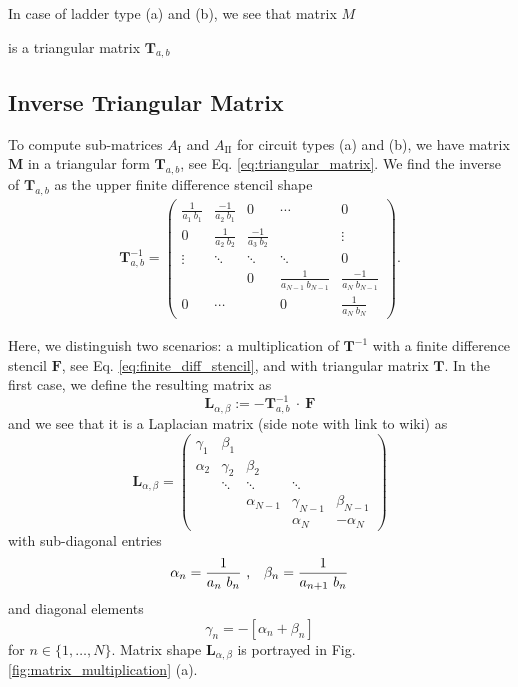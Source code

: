 \documentclass[a4paper, 10pt, twoside, twocolumn]{scrartcl}
\begin{document}
In case of ladder type (a) and (b), we see that matrix $M$

is a triangular matrix $\mathbf{T}_{a,b}$

\subsection*{Inverse Triangular Matrix}
To compute sub-matrices $A_{\mathrm{I}}$ and $A_{\mathrm{II}}$ for circuit types (a) and (b), we have matrix $\mathbf{M}$ in a triangular form $\mathbf{T}_{a,b}$, see Eq. \eqref{eq:triangular_matrix}. We find the inverse of $\mathbf{T}_{a,b}$ as the upper finite difference stencil shape 
\begin{align*}
	\mathbf{T}_{a,b}^{-1} = 
	\begin{pmatrix}
		\frac{1}{a_{1} ~ b_{1}} & \frac{-1}{a_{2} ~ b_{1}} & 0  						& \cdots & 0 \\[1ex]
		0 						 &   \frac{1}{a_{2} ~ b_{2}} & \frac{-1}{a_{3} ~ b_{2}} &  & \vdots \\
		\vdots 				 		 &  \ddots 					 & \ddots 					 & \ddots & 0	 \\
		&  & 0 & \frac{1}{a_{N-1} ~ b_{N-1}} & \frac{-1}{a_{N} ~ b_{N-1}} \\[1ex]
		0  & \cdots 	& &  			0			   & \frac{1}{a_{N} ~ b_{N}} 
	\end{pmatrix} \text{.}
\end{align*}

Here, we distinguish two scenarios: a multiplication of $\mathbf{T}^{-1}$ with a finite difference stencil $\mathbf{F}$, see Eq. \eqref{eq:finite_diff_stencil}, and with triangular matrix $\mathbf{T}$. In the first case, we define the resulting matrix as
\begin{equation}
	\mathbf{L}_{\alpha,\beta} := -\mathbf{T}_{a,b}^{-1} ~\cdot~ \mathbf{F}
\end{equation}
and we see that it is a Laplacian matrix {\color{red} (side note with link to wiki)} as
\begin{equation}
	\mathbf{L}_{\alpha,\beta} =
	\begin{pmatrix}
		\gamma_{1} & \beta_{1} \\
		\alpha_{2} & \gamma_{2} & \beta_{2} \\
		& \ddots & \ddots & \ddots \\
		& & \alpha_{N-1} & \gamma_{N-1} & \beta_{N-1} \\
		& & & \alpha_{N} & -\alpha_{N}
	\end{pmatrix}
\end{equation}
with sub-diagonal entries
\begin{equation}
	\alpha_{n} = \frac{1}{a_{n}~ b_{n}} ~ \text{,} \quad 
	\beta_{n} =  \frac{1}{a_{n+1}~ b_{n}} \\
\end{equation}
and diagonal elements
\begin{equation*}
	\gamma_{n} = -\left[\alpha_{n}+\beta_{n}\right]
\end{equation*}
for $n\in\{1,\ldots,N\}$. Matrix shape $\mathbf{L}_{\alpha,\beta}$ is portrayed in Fig. \ref{fig:matrix_multiplication} (a).
\end{document}
